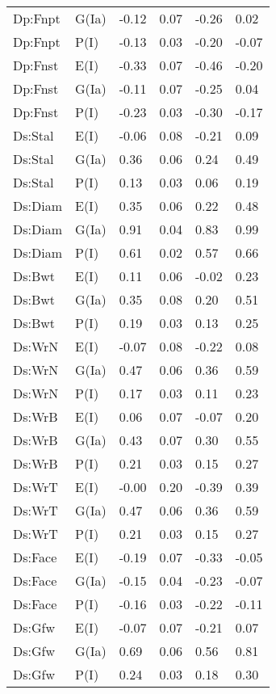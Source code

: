 \begin{center}
\begin{longtable}{|p{1.1in}|p{0.7in}|p{0.7in}|p{0.6in}|p{0.6in}|p{0.6in}|}
  Dp:Fnpt & G(Ia) & -0.12 & 0.07 & -0.26 & 0.02 \\ 
  Dp:Fnpt & P(I) & -0.13 & 0.03 & -0.20 & -0.07 \\ 
  Dp:Fnst & E(I) & -0.33 & 0.07 & -0.46 & -0.20 \\ 
  Dp:Fnst & G(Ia) & -0.11 & 0.07 & -0.25 & 0.04 \\ 
  Dp:Fnst & P(I) & -0.23 & 0.03 & -0.30 & -0.17 \\ 
  Ds:Stal & E(I) & -0.06 & 0.08 & -0.21 & 0.09 \\ 
  Ds:Stal & G(Ia) & 0.36 & 0.06 & 0.24 & 0.49 \\ 
  Ds:Stal & P(I) & 0.13 & 0.03 & 0.06 & 0.19 \\ 
  Ds:Diam & E(I) & 0.35 & 0.06 & 0.22 & 0.48 \\ 
  Ds:Diam & G(Ia) & 0.91 & 0.04 & 0.83 & 0.99 \\ 
  Ds:Diam & P(I) & 0.61 & 0.02 & 0.57 & 0.66 \\ 
  Ds:Bwt & E(I) & 0.11 & 0.06 & -0.02 & 0.23 \\ 
  Ds:Bwt & G(Ia) & 0.35 & 0.08 & 0.20 & 0.51 \\ 
  Ds:Bwt & P(I) & 0.19 & 0.03 & 0.13 & 0.25 \\ 
  Ds:WrN & E(I) & -0.07 & 0.08 & -0.22 & 0.08 \\ 
  Ds:WrN & G(Ia) & 0.47 & 0.06 & 0.36 & 0.59 \\ 
  Ds:WrN & P(I) & 0.17 & 0.03 & 0.11 & 0.23 \\ 
  Ds:WrB & E(I) & 0.06 & 0.07 & -0.07 & 0.20 \\ 
  Ds:WrB & G(Ia) & 0.43 & 0.07 & 0.30 & 0.55 \\ 
  Ds:WrB & P(I) & 0.21 & 0.03 & 0.15 & 0.27 \\ 
  Ds:WrT & E(I) & -0.00 & 0.20 & -0.39 & 0.39 \\ 
  Ds:WrT & G(Ia) & 0.47 & 0.06 & 0.36 & 0.59 \\ 
  Ds:WrT & P(I) & 0.21 & 0.03 & 0.15 & 0.27 \\ 
  Ds:Face & E(I) & -0.19 & 0.07 & -0.33 & -0.05 \\ 
  Ds:Face & G(Ia) & -0.15 & 0.04 & -0.23 & -0.07 \\ 
  Ds:Face & P(I) & -0.16 & 0.03 & -0.22 & -0.11 \\ 
  Ds:Gfw & E(I) & -0.07 & 0.07 & -0.21 & 0.07 \\ 
  Ds:Gfw & G(Ia) & 0.69 & 0.06 & 0.56 & 0.81 \\ 
  Ds:Gfw & P(I) & 0.24 & 0.03 & 0.18 & 0.30 \\ 

\end{longtable}
\end{center}

